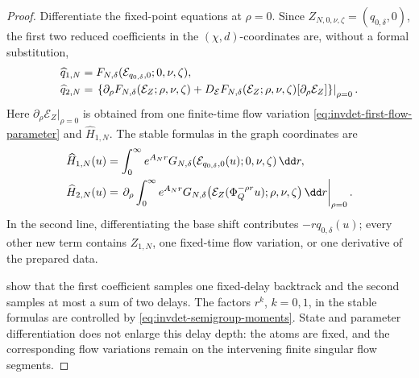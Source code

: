 \begin{proof}
Differentiate the fixed-point equations at \(\rho=0\).  Since
\(Z_{N,0,\nu,\zeta}=(q_{0,\delta},0)\), the first two reduced coefficients
in the \((\chi,d)\)-coordinates are, without a formal substitution,
\begin{align}
 \widehat q_{1,N}
 &=F_{N,\delta}(\mathcal E_{q_{0,\delta},0};
                       0,\nu,\zeta),\notag\\
 \widehat q_{2,N}
 &=\left.
   \left\{\partial_\rho F_{N,\delta}(\mathcal E_Z;\rho,\nu,\zeta)
   +D_{\mathcal E}F_{N,\delta}(\mathcal E_Z;\rho,\nu,\zeta)
          [\partial_\rho\mathcal E_Z]\right\}
   \right|_{\rho=0}.                                  \label{eq:invdet-q1-q2-formulas}
\end{align}
Here \(\partial_\rho\mathcal E_Z|_{\rho=0}\) is obtained from one
finite-time flow variation \cref{eq:invdet-first-flow-parameter} and
\(\widehat H_{1,N}\).  The stable formulas in the graph coordinates are
\begin{align}
 \widehat H_{1,N}(u)
 &=\int_0^\infty e^{A_Nr}
 G_{N,\delta}(\mathcal E_{q_{0,\delta},0}(u);
                         0,\nu,\zeta)\,\dd r,\notag\\
 \widehat H_{2,N}(u)
 &=\left.\partial_\rho
 \int_0^\infty e^{A_Nr}
 G_{N,\delta}\bigl(
   \mathcal E_Z(\Phi_Q^{-\rho r}u);
   \rho,\nu,\zeta\bigr)\,\dd r\right|_{\rho=0}.        \label{eq:invdet-H1-H2-formulas}
\end{align}
In the second line, differentiating the base shift contributes
\(-r q_{0,\delta}(u)\); every other new term contains \(Z_{1,N}\), one
fixed-time flow variation, or one derivative of the prepared data.

 show
that the first coefficient samples one fixed-delay backtrack and the second
samples at most a sum of two delays.  The factors \(r^k\), \(k=0,1\), in
the stable formulas are controlled by
\cref{eq:invdet-semigroup-moments}.  State and parameter differentiation
does not enlarge this delay depth: the atoms are fixed, and the
corresponding flow variations remain on the intervening finite singular
flow segments.


\end{proof}
